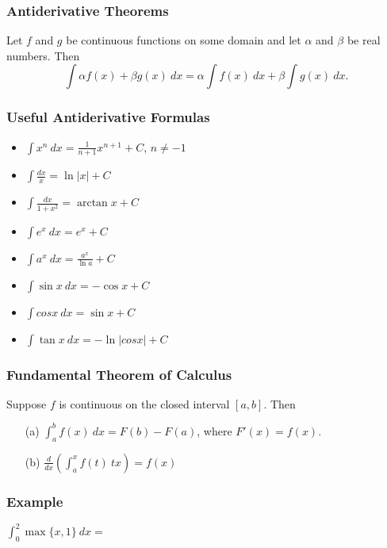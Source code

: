 \documentclass{beamer}
\begin{document}
\begin{frame}
\frametitle{Antiderivative Theorems}
\begin{Theorem}
Let $f$ and $g$ be continuous functions on some domain and let $\alpha$ and $\beta$ be real numbers. Then
$$
\int \alpha f(x) + \beta g(x)\ dx = \alpha \int f(x)\ dx + \beta \int g(x)\ dx.
$$
\end{Theorem}
\end{frame}

\begin{frame}
\frametitle{Useful Antiderivative Formulas}
\begin{multicols}{2}
{\small 
\begin{itemize}
\item $\displaystyle \int x^n\ dx = \frac{1}{n+ 1} x^{n+ 1} + C$, $n\neq -1$
\item $\displaystyle \int \frac{dx}{x} = \ln|x| + C$	
\item $\displaystyle \int \frac{dx}{1 + x^2} = \arctan x + C$	
\item $\displaystyle \int e^x\ dx  = e^x + C$
\item $\displaystyle \int a^x\ dx = \frac{a^x}{\ln a} + C$
\item $\displaystyle\int \sin x\ dx = -\cos x + C$
\item $\displaystyle \int cos x\ dx= \sin x + C$
\item $\displaystyle\int \tan x\ dx = -\ln|cos x| + C$
\end{itemize}
}
\end{multicols}

\end{frame}

\begin{frame}
\frametitle{Fundamental Theorem of Calculus}

\begin{Theorem}
Suppose $f$ is continuous on the closed interval $[a, b]$. Then
\begin{enumerate}
\item[(a)] $\displaystyle\int_a^b f(x)\ dx = F(b) - F(a)$, where $F'(x)= f(x)$.
\item[(b)] $\displaystyle\frac{d}{dx}\left(\int_a^x f(t)\ tx\right) = f(x)$
\end{enumerate}
\end{Theorem}
\end{frame}

\begin{frame}[t]
\frametitle{Example}

\begin{Example}
$\displaystyle \int_0^2 \max\{x, 1\}\ dx = $
\end{Example}

\end{frame}
\end{document}
